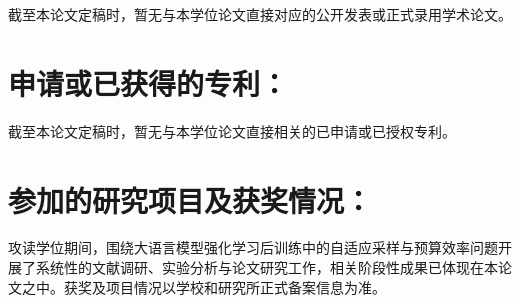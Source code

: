 截至本论文定稿时，暂无与本学位论文直接对应的公开发表或正式录用学术论文。

\section*{申请或已获得的专利：}

截至本论文定稿时，暂无与本学位论文直接相关的已申请或已授权专利。

\section*{参加的研究项目及获奖情况：}

攻读学位期间，围绕大语言模型强化学习后训练中的自适应采样与预算效率问题开展了系统性的文献调研、实验分析与论文研究工作，相关阶段性成果已体现在本论文之中。获奖及项目情况以学校和研究所正式备案信息为准。

\cleardoublepage[plain]%
